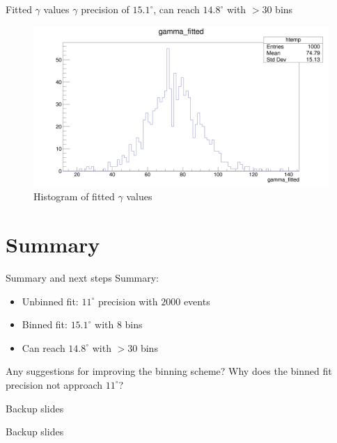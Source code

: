 \documentclass{beamer}
\begin{document}
\begin{frame}{Fitted $\gamma$ values}
  $\gamma$ precision of $15.1^\circ$, can reach $14.8^\circ$ with $>30$ bins
  \begin{figure}
    \centering
    \includegraphics[width = 1.0\textwidth]{OptimizedAmplitudePulls/gammafitted1K1K.png}
    \caption{Histogram of fitted $\gamma$ values}
  \end{figure}
\end{frame}

\section{Summary}
\begin{frame}{Summary and next steps}
  Summary:
  \begin{itemize}
    \item{Unbinned fit: $11^\circ$ precision with $2000$ events}
    \item{Binned fit: $15.1^\circ$ with $8$ bins}
    \item{Can reach $14.8^\circ$ with $>30$ bins}
  \end{itemize}
  Any suggestions for improving the binning scheme?
  Why does the binned fit precision not approach $11^\circ$?
\end{frame}

\begin{frame}{Backup slides}
  \begin{center}
    Backup slides
  \end{center}
\end{frame}
\end{document}
